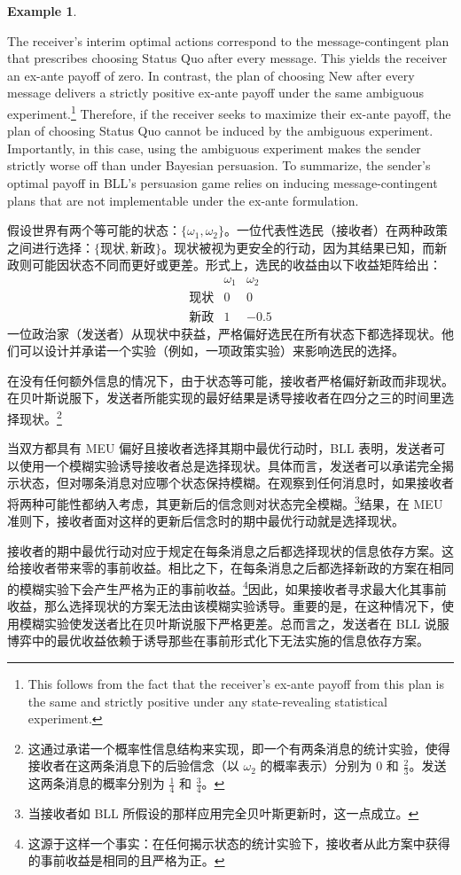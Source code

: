 \documentclass[12pt,a4paper]{article}
\theoremstyle{definition}
\newtheorem{example}{Example}[section]
\theoremstyle{remark}
\newenvironment{original}{%
    \par\medskip\noindent%
    \begin{tcolorbox}[%
        colback=white,%
        colframe=black!50,%
        title=\textbf{Original English},%
        fonttitle=\small\bfseries,%
        left=0pt, right=0pt, top=2pt, bottom=2pt,%
        boxrule=0.5pt,%
        arc=0pt,%
        outer arc=0pt%
    ]%
    \small%
}{%
    \end{tcolorbox}%
}
\newenvironment{translation}{%
    \par\smallskip\noindent%
    \begin{tcolorbox}[%
        colback=blue!3!white,%
        colframe=blue!40!black,%
        title=\textbf{中文翻译},%
        fonttitle=\small\bfseries,%
        left=0pt, right=0pt, top=2pt, bottom=2pt,%
        boxrule=0.5pt,%
        arc=0pt,%
        outer arc=0pt%
    ]%
    \small\color{blue!60!black}%
}{%
    \end{tcolorbox}\medskip%
}
\begin{document}
\begin{example}
\begin{original}
The receiver's interim optimal actions correspond to the message-contingent plan that prescribes choosing Status Quo after every message. This yields the receiver an ex-ante payoff of zero. In contrast, the plan of choosing New after every message delivers a strictly positive ex-ante payoff under the same ambiguous experiment.\footnote{This follows from the fact that the receiver's ex-ante payoff from this plan is the same and strictly positive under any state-revealing statistical experiment.} Therefore, if the receiver seeks to maximize their ex-ante payoff, the plan of choosing Status Quo cannot be induced by the ambiguous experiment. Importantly, in this case, using the ambiguous experiment makes the sender strictly worse off than under Bayesian persuasion. To summarize, the sender's optimal payoff in BLL's persuasion game relies on inducing message-contingent plans that are not implementable under the ex-ante formulation.
\end{original}
\begin{translation}
假设世界有两个等可能的状态：$\{\omega_1, \omega_2\}$。一位代表性选民（接收者）在两种政策之间进行选择：$\{\text{现状}, \text{新政}\}$。现状被视为更安全的行动，因为其结果已知，而新政则可能因状态不同而更好或更差。形式上，选民的收益由以下收益矩阵给出：
\[
\begin{array}{c|cc}
 & \omega_1 & \omega_2 \\
\hline
\text{现状} & 0 & 0 \\
\text{新政} & 1 & -0.5
\end{array}
\]
一位政治家（发送者）从现状中获益，严格偏好选民在所有状态下都选择现状。他们可以设计并承诺一个实验（例如，一项政策实验）来影响选民的选择。

在没有任何额外信息的情况下，由于状态等可能，接收者严格偏好新政而非现状。在贝叶斯说服下，发送者所能实现的最好结果是诱导接收者在四分之三的时间里选择现状。\footnote{这通过承诺一个概率性信息结构来实现，即一个有两条消息的统计实验，使得接收者在这两条消息下的后验信念（以 $\omega_2$ 的概率表示）分别为 $0$ 和 $\frac{2}{3}$。发送这两条消息的概率分别为 $\frac{1}{4}$ 和 $\frac{3}{4}$。}

当双方都具有 MEU 偏好且接收者选择其期中最优行动时，BLL 表明，发送者可以使用一个模糊实验诱导接收者总是选择现状。具体而言，发送者可以承诺完全揭示状态，但对哪条消息对应哪个状态保持模糊。在观察到任何消息时，如果接收者将两种可能性都纳入考虑，其更新后的信念则对状态完全模糊。\footnote{当接收者如 BLL 所假设的那样应用完全贝叶斯更新时，这一点成立。}结果，在 MEU 准则下，接收者面对这样的更新后信念时的期中最优行动就是选择现状。

接收者的期中最优行动对应于规定在每条消息之后都选择现状的信息依存方案。这给接收者带来零的事前收益。相比之下，在每条消息之后都选择新政的方案在相同的模糊实验下会产生严格为正的事前收益。\footnote{这源于这样一个事实：在任何揭示状态的统计实验下，接收者从此方案中获得的事前收益是相同的且严格为正。}因此，如果接收者寻求最大化其事前收益，那么选择现状的方案无法由该模糊实验诱导。重要的是，在这种情况下，使用模糊实验使发送者比在贝叶斯说服下严格更差。总而言之，发送者在 BLL 说服博弈中的最优收益依赖于诱导那些在事前形式化下无法实施的信息依存方案。
\end{translation}
\end{example}
\end{document}
